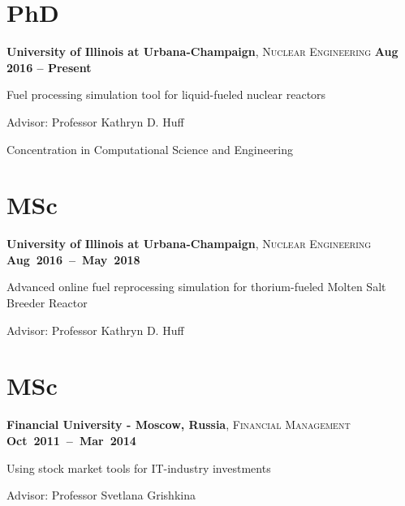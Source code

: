 \documentclass[margin,line]{resume}
\begin{document}
\begin{resume}
    \section{\mysidestyle PhD}
    \textbf{University of Illinois at Urbana-Champaign}, \textsc{Nuclear Engineering}\hfill \textbf{ Aug 2016 -- Present}\vspace{-3mm}\\\vspace{-1mm}%
    \begin{list2}
        \item Fuel processing simulation tool for liquid-fueled nuclear reactors
        \item Advisor:  Professor Kathryn D. Huff
        \item Concentration in Computational Science and Engineering
    \end{list2}\vspace{-1.5mm}
    \section{\mysidestyle MSc}
    \textbf{University of Illinois at Urbana-Champaign}, \textsc{Nuclear Engineering} \hfill\textbf{\mbox{Aug 2016 -- May 2018}}\vspace{-3mm}\\\vspace{-1mm}%
    \begin{list2}
        \item Advanced online fuel reprocessing simulation for thorium-fueled Molten Salt Breeder Reactor
        \item Advisor:  Professor Kathryn D. Huff
    \end{list2}\vspace{-1.5mm}
    \section{\mysidestyle MSc}
    \textbf{Financial University - Moscow, Russia}, \textsc{Financial Management} \hfill \textbf{\mbox{Oct 2011 -- Mar 2014	}}\vspace{-3mm}\\\vspace{-1mm}%
    \begin{list2}
        \item Using stock market tools for IT-industry investments
        \item Advisor:  Professor Svetlana Grishkina
    \end{list2}\vspace{-1.5mm}

\end{resume}
\end{document}
